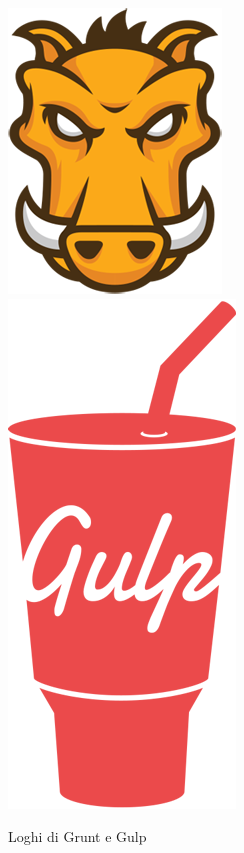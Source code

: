 \begin{figure}
  \vspace{-65pt}
  \begin{center}
    \includegraphics[scale=0.4]{Figures/grunt-logo.png}
	\includegraphics[scale=0.3]{Figures/gulp-logo.png}  
  \end{center}
  \vspace{-10pt}{
	"directory" : "js/vendor"
}

  \caption{Loghi di Grunt e Gulp}
  \label{fig:task runner}
  \vspace{0pt}
\end{figure}

